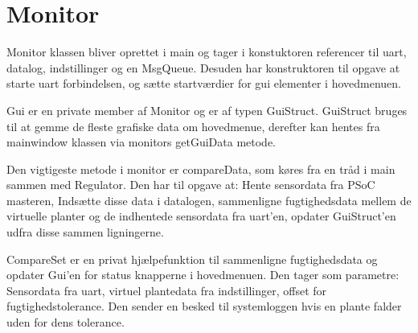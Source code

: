 \clearpage

\section{Monitor} \label{sec:Monitor_impl}

Monitor klassen bliver oprettet i main og tager i konstuktoren referencer til uart, datalog, indstillinger og en MsgQueue. Desuden har konstruktoren til opgave at starte uart forbindelsen, og sætte startværdier for gui elementer i hovedmenuen. 



Gui er en private member af Monitor og er af typen GuiStruct. GuiStruct bruges til at gemme de fleste grafiske data om hovedmenue, derefter kan hentes fra mainwindow klassen via monitors getGuiData metode.



Den vigtigeste metode i monitor er compareData, som køres fra en tråd i main sammen med Regulator. Den har til opgave at: Hente sensordata fra PSoC masteren, Indsætte disse data i datalogen, sammenligne fugtighedsdata mellem de virtuelle planter og de indhentede sensordata fra uart'en, opdater GuiStruct'en udfra disse sammen ligningerne.   



CompareSet er en privat hjælpefunktion til sammenligne fugtighedsdata og opdater Gui'en for status knapperne i hovedmenuen. Den tager som parametre: Sensordata fra uart, virtuel plantedata fra indstillinger, offset for fugtighedstolerance. Den sender en besked til systemloggen hvis en plante falder uden for dens tolerance.

